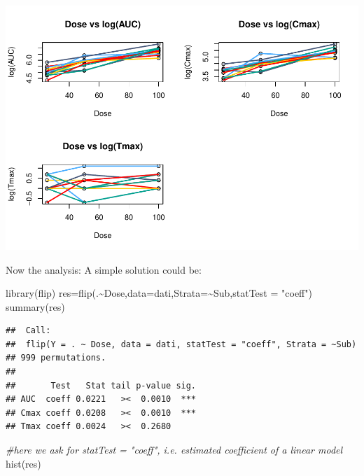 \documentclass[
]{article}
\newenvironment{Shaded}{\begin{snugshade}}{\end{snugshade}}
\newcommand{\AttributeTok}[1]{\textcolor[rgb]{0.77,0.63,0.00}{#1}}
\newcommand{\CommentTok}[1]{\textcolor[rgb]{0.56,0.35,0.01}{\textit{#1}}}
\newcommand{\FunctionTok}[1]{\textcolor[rgb]{0.00,0.00,0.00}{#1}}
\newcommand{\NormalTok}[1]{#1}
\newcommand{\OtherTok}[1]{\textcolor[rgb]{0.56,0.35,0.01}{#1}}
\newcommand{\SpecialCharTok}[1]{\textcolor[rgb]{0.00,0.00,0.00}{#1}}
\newcommand{\StringTok}[1]{\textcolor[rgb]{0.31,0.60,0.02}{#1}}
\begin{document}
\begin{center}\includegraphics{perm_files/figure-latex/unnamed-chunk-41-1} \end{center}

Now the analysis: A simple solution could be:

\begin{Shaded}
\begin{Highlighting}[]
\FunctionTok{library}\NormalTok{(flip)}
\NormalTok{res}\OtherTok{=}\FunctionTok{flip}\NormalTok{(.}\SpecialCharTok{\textasciitilde{}}\NormalTok{Dose,}\AttributeTok{data=}\NormalTok{dati,}\AttributeTok{Strata=}\SpecialCharTok{\textasciitilde{}}\NormalTok{Sub,}\AttributeTok{statTest =} \StringTok{"coeff"}\NormalTok{)}
\FunctionTok{summary}\NormalTok{(res)}
\end{Highlighting}
\end{Shaded}

\begin{verbatim}
##  Call:
##  flip(Y = . ~ Dose, data = dati, statTest = "coeff", Strata = ~Sub) 
## 999 permutations.
## 
##       Test   Stat tail p-value sig.
## AUC  coeff 0.0221   ><  0.0010  ***
## Cmax coeff 0.0208   ><  0.0010  ***
## Tmax coeff 0.0024   ><  0.2680
\end{verbatim}

\begin{Shaded}
\begin{Highlighting}[]
\CommentTok{\#here we ask for statTest = "coeff", i.e. estimated coefficient of a linear model}
\FunctionTok{hist}\NormalTok{(res)}
\end{Highlighting}
\end{Shaded}
\end{document}
